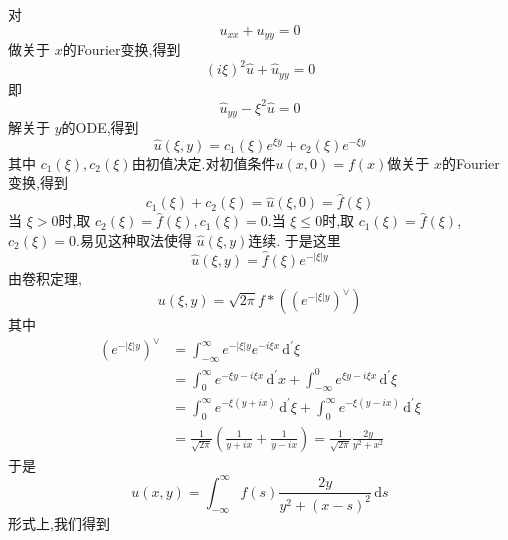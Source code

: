 \documentclass[../../main.tex]{subfiles}
\begin{document}
对 \[
u_{x x}+ u_{yy}= 0
\]做关于 \(  x  \)的Fourier变换,得到
\[
\left( i \xi  \right)^{2} \hat{u}+ \hat{u}_{yy}= 0
\]即 \[
\hat{u}_{yy}- \xi ^{2}\hat{u}= 0
\] 解关于 \(  y  \)的ODE,得到 \[
\hat{u}\left(  \xi ,y \right)= c_1\left(  \xi  \right) e^{ \xi y}+ c_2\left(  \xi  \right)e^{- \xi y}  
\]其中 \(  c_1\left(  \xi  \right),c_2\left(  \xi  \right)    \)由初值决定.对初值条件\(  u\left( x,0 \right)= f\left( x \right)    \)做关于 \(  x  \)的Fourier变换,得到 \[
c_1\left(  \xi  \right)+ c_2\left(  \xi  \right)=   \hat{u}\left(  \xi ,0 \right)= \hat{f}\left(  \xi  \right)  
\]     当 \(   \xi > 0  \)时,取 \(  c_2\left(  \xi  \right)= \hat{f}\left(  \xi  \right),c_1\left(  \xi  \right)= 0     \).当 \(   \xi \le 0  \)时,取 \(  c_1\left(  \xi  \right)= \hat{f}\left(  \xi  \right)    \),\(  c_2\left(  \xi  \right)= 0   \).易见这种取法使得 \(  \hat{u}\left(  \xi  ,y\right)   \)连续.    于是这里 \[
\hat{u}\left(  \xi ,y \right)=  \hat{f}\left(  \xi  \right)e^{-\left|  \xi  \right|y } 
\]  由卷积定理, \[
u\left(  \xi ,y \right)= \sqrt{2\pi }f*\left( \left( e^{-\left|  \xi  \right|y } \right)^{\vee }  \right)  
\]其中 \[
\begin{aligned}
\left( e^{-\left|  \xi  \right|y } \right)^{\vee }&= \int_{-\infty}^{\infty}e^{-\left|  \xi  \right|y }e^{-i \xi x}\,\mathrm{d} ^{\prime}  \xi\\ 
 & = \int_{0}^{\infty}e^{- \xi y-i \xi x}  \,\mathrm{d} ^{\prime} x+ \int_{-\infty}^{0}e^{ \xi y-i \xi x}\,\mathrm{d} ^{\prime}  \xi \\ 
 &=\int_{0}^{\infty}e^{- \xi \left( y+ ix \right) }\,\mathrm{d} ^{\prime}  \xi + \int_{0}^{\infty}e^{- \xi \left( y-ix \right) }\,\mathrm{d} ^{\prime}  \xi \\ 
  &= \frac{1 }{\sqrt{2\pi } } \left( \frac{1 }{y+ ix } + \frac{1 }{y-ix } \right) = \frac{1 }{\sqrt{2\pi } } \frac{2y }{y^{2}+ x^{2} }  
\end{aligned}
\]于是 \[
u\left( x ,y \right)= \int_{-\infty}^{\infty} f\left( s \right)\frac{2y }{y^{2}+ \left( x-s \right)^{2}  }\,\mathrm{d} s  
\]
形式上,我们得到 
\begin{center}
\end{center}
\end{document}
